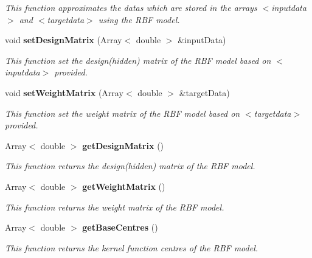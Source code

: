 \begin{CompactItemize}
\begin{CompactList}\small\item\em This function approximates the datas which are stored in the arrays $<$inputdata$>$ and $<$targetdata$>$ using the RBF model. \item\end{CompactList}\item 
void {\bf set\-Design\-Matrix} (Array$<$ double $>$ \&input\-Data)
\begin{CompactList}\small\item\em This function set the design(hidden) matrix of the RBF model based on $<$inputdata$>$ provided. \item\end{CompactList}\item 
void {\bf set\-Weight\-Matrix} (Array$<$ double $>$ \&target\-Data)
\begin{CompactList}\small\item\em This function set the weight matrix of the RBF model based on $<$targetdata$>$ provided. \item\end{CompactList}\item 
Array$<$ double $>$ {\bf get\-Design\-Matrix} ()
\begin{CompactList}\small\item\em This function returns the design(hidden) matrix of the RBF model. \item\end{CompactList}\item 
Array$<$ double $>$ {\bf get\-Weight\-Matrix} ()
\begin{CompactList}\small\item\em This function returns the weight matrix of the RBF model. \item\end{CompactList}\item 
Array$<$ double $>$ {\bf get\-Base\-Centres} ()
\begin{CompactList}\small\item\em This function returns the kernel function centres of the RBF model. \item\end{CompactList}\end{CompactItemize}
